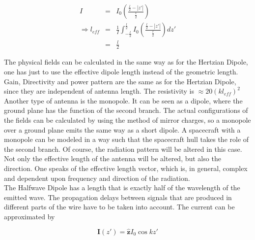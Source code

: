 \documentclass[a4paper,14pt]{extbook}
\begin{document}

\begin{eqnarray}
I&=&I_0 \left( \frac{\frac{l}{2}-|z'|}{\frac{l}{2}}\right) \label{l_eff_shd_1} \\
\Rightarrow  l_{eff}&=& \frac{1}{I} \int_{-\frac{l}{2}}^{\frac{l}{2}} I_0 \left( \frac{\frac{l}{2}-|z'|}{\frac{l}{2}}\right) dz' \label{l_eff_shd_2} \\
&=&\frac{l}{2} \nonumber
\end{eqnarray}

The physical fields can be calculated in the same way as for the Hertzian Dipole, one has just to use the effective dipole length instead of the geometric length. Gain, Directivity and power pattern are the same as for the Hertzian Dipole, since they are independent of antenna length. The resistivity is $\approx 20 (k l_{eff} )^2$
\\

Another type of antenna is the monopole. It can be seen as a dipole, where the ground plane has the function of the second branch. The actual configurations of the fields can be calculated by using the method of mirror charges, so a monopole over a ground plane emits the same way as a short dipole. A spacecraft with a monopole can be modeled in a way such that the spacecraft hull takes the role of the second branch. Of course, the radiation pattern will be altered in this case. Not only the effective length of the antenna will be altered, but also the direction. One speaks of the effective length vector, which is, in general, complex and dependent upon frequency and direction of the radiation.\\

The Halfwave Dipole has a length that is exactly half of the wavelength of the emitted wave. The propagation delays between signals that are produced in different parts of the wire have to be taken into account. The current can be approximated by

\begin{equation}\label{hwd_current}
 \mathbf{I}(z') = \mathbf{\hat{z}} I_0 \cos kz'
\end{equation}
\end{document}
